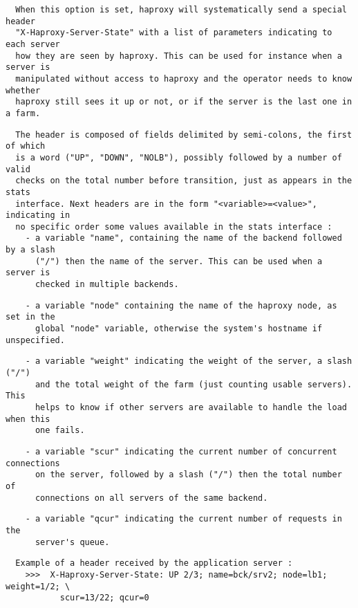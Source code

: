 \begin{verbatim}
  When this option is set, haproxy will systematically send a special header
  "X-Haproxy-Server-State" with a list of parameters indicating to each server
  how they are seen by haproxy. This can be used for instance when a server is
  manipulated without access to haproxy and the operator needs to know whether
  haproxy still sees it up or not, or if the server is the last one in a farm.
\end{verbatim}

\begin{verbatim}
  The header is composed of fields delimited by semi-colons, the first of which
  is a word ("UP", "DOWN", "NOLB"), possibly followed by a number of valid
  checks on the total number before transition, just as appears in the stats
  interface. Next headers are in the form "<variable>=<value>", indicating in
  no specific order some values available in the stats interface :
    - a variable "name", containing the name of the backend followed by a slash
      ("/") then the name of the server. This can be used when a server is
      checked in multiple backends.
\end{verbatim}

\begin{verbatim}
    - a variable "node" containing the name of the haproxy node, as set in the
      global "node" variable, otherwise the system's hostname if unspecified.
\end{verbatim}

\begin{verbatim}
    - a variable "weight" indicating the weight of the server, a slash ("/")
      and the total weight of the farm (just counting usable servers). This
      helps to know if other servers are available to handle the load when this
      one fails.
\end{verbatim}

\begin{verbatim}
    - a variable "scur" indicating the current number of concurrent connections
      on the server, followed by a slash ("/") then the total number of
      connections on all servers of the same backend.
\end{verbatim}

\begin{verbatim}
    - a variable "qcur" indicating the current number of requests in the
      server's queue.
\end{verbatim}

\begin{verbatim}
  Example of a header received by the application server :
    >>>  X-Haproxy-Server-State: UP 2/3; name=bck/srv2; node=lb1; weight=1/2; \
           scur=13/22; qcur=0
\end{verbatim}

